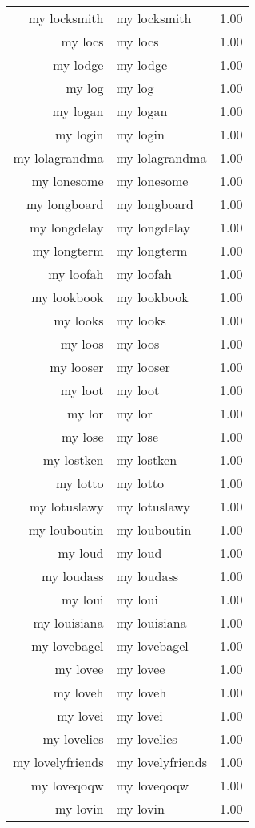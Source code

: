 \begin{table}[ht]
\begin{tabular}{rlr}
  my locksmith & my locksmith & 1.00 \\ 
  my locs & my locs & 1.00 \\ 
  my lodge & my lodge & 1.00 \\ 
  my log & my log & 1.00 \\ 
  my logan & my logan & 1.00 \\ 
  my login & my login & 1.00 \\ 
  my lolagrandma & my lolagrandma & 1.00 \\ 
  my lonesome & my lonesome & 1.00 \\ 
  my longboard & my longboard & 1.00 \\ 
  my longdelay & my longdelay & 1.00 \\ 
  my longterm & my longterm & 1.00 \\ 
  my loofah & my loofah & 1.00 \\ 
  my lookbook & my lookbook & 1.00 \\ 
  my looks & my looks & 1.00 \\ 
  my loos & my loos & 1.00 \\ 
  my looser & my looser & 1.00 \\ 
  my loot & my loot & 1.00 \\ 
  my lor & my lor & 1.00 \\ 
  my lose & my lose & 1.00 \\ 
  my lostken & my lostken & 1.00 \\ 
  my lotto & my lotto & 1.00 \\ 
  my lotuslawy & my lotuslawy & 1.00 \\ 
  my louboutin & my louboutin & 1.00 \\ 
  my loud & my loud & 1.00 \\ 
  my loudass & my loudass & 1.00 \\ 
  my loui & my loui & 1.00 \\ 
  my louisiana & my louisiana & 1.00 \\ 
  my lovebagel & my lovebagel & 1.00 \\ 
  my lovee & my lovee & 1.00 \\ 
  my loveh & my loveh & 1.00 \\ 
  my lovei & my lovei & 1.00 \\ 
  my lovelies & my lovelies & 1.00 \\ 
  my lovelyfriends & my lovelyfriends & 1.00 \\ 
  my loveqoqw & my loveqoqw & 1.00 \\ 
  my lovin & my lovin & 1.00 \\ 

\end{tabular}
\end{table}
